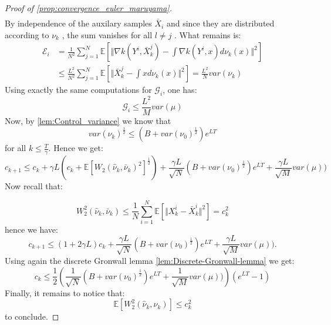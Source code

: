 \begin{proof}[Proof of \cref{prop:convergence_euler_maruyama}]
\begin{align*}
\end{align*}
 By independence of the auxilary samples $\bar{X}_{i}$ and since
they are distributed according to $\nu_{k}$ , the sum vanishes for
all $l\neq j$ . What remains is:
\begin{align*}
\mathcal{E}_{i} & =\frac{1}{N^{2}}\sum_{j=1}^{N}\mathbb{E}\left[\Vert\nabla k(Y^{i},\bar{X}_{k}^{j})-\int\nabla k(Y^{i},x)d\nu_{k}(x)\Vert^{2}\right]\\
 & \leq\frac{L^{2}}{N^{2}}\sum_{j=1}^{N}\mathbb{E}[\Vert\bar{X}_{k}^{j}-\int xd\nu_{k}(x)\Vert^{2}]=\frac{L^{2}}{N}var(\nu_{k})
\end{align*}
Using exactly the same computations for $\mathcal{G}_{i}$, one has:
\[
\mathcal{G}_{i}\leq\frac{L^{2}}{M}var(\mu)
\]
Now, by \ref{lem:Control_variance} we know that 
\[
var(\nu_{k})^{\frac{1}{2}}\leq(B+var(\nu_{0})^{\frac{1}{2}})e^{LT}
\]
for all $k\leq\frac{T}{\gamma}$. Hence we get:
\[
c_{k+1}\leq c_{k}+\gamma L(c_{k}+\mathbb{E}[W_{2}(\hat{\nu}_{k},\bar{\nu}_{k})^{2}]^{\frac{1}{2}})+\frac{\gamma L}{\sqrt{N}}(B+var(\nu_{0})^{\frac{1}{2}})e^{LT}+\frac{\gamma L}{\sqrt{M}}var(\mu))
\]
Now recall that:

\[
W_{2}^{2}(\hat{\nu}_{k},\bar{\nu}_{k})\leq\frac{1}{N}\sum_{i=1}^{N}\mathbb{E}\left[\Vert X_{k}^{i}-\bar{X}_{k}^{i}\Vert^{2}\right]=c_{k}^{2}
\]
hence we have:
\[
c_{k+1}\leq(1+2\gamma L)c_{k}+\frac{\gamma L}{\sqrt{N}}(B+var(\nu_{0})^{\frac{1}{2}})e^{LT}+\frac{\gamma L}{\sqrt{M}}var(\mu)).
\]
Using again the discrete Gronwall lemma \ref{lem:Discrete-Gronwall-lemma}
we get:
\[
c_{k}\leq\frac{1}{2}\left(\frac{1}{\sqrt{N}}(B+var(\nu_{0})^{\frac{1}{2}})e^{LT}+\frac{1}{\sqrt{M}}var(\mu))\right)(e^{LT}-1)
\]
Finally, it remains to notice that:
\[
\mathbb{E}[W_{2}^{2}(\hat{\nu}_{k},\nu_{k})]\leq c_{k}^{2}
\]
to conclude. 
\end{proof}



